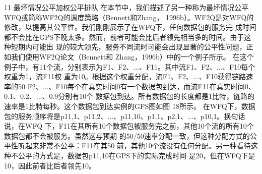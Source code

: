 11 最坏情况公平加权公平排队
在本节中，我们描述了另一种称为最坏情况公平WFQ或简称WF2Q的调度策略（Bennett和Zhang，
1996b）。WF2Q是对WFQ的修改，以提高其公平性。我们刚刚展示了在WFQ下，任何数据包的服务完
成时间都不会比在GPS下晚太多。然而，前者可能会比后者领先相当多的时间。由于这种短期内可能出
现的较大领先，服务不同流时可能会出现显著的公平性问题，正如我们使用WF2Q论文（Bennett和
Zhang，1996b）中的一个例子所示。
在这个例子中，有11个流，分别表示为F1、F2、...、F11。其中流F1、F2、...、F10每个权重为1，流F11权
重为10。根据这个权重分配，流F1、F2、...、F10获得链路速率的50%
F2、...、F10每个在真实时间0有一个数据包到达，而流F11在真实时间0、0.1、0.2、...、0.9分别有10个
数据包到达。所有数据包的长度都是1比特，链路的速率是1比特每秒。这个数据包到达实例的GPS图如图
18所示。
在WFQ下，数据包的服务顺序将是p11,1、p11,2、...、p11,10、p1,1、p2,1、...、p10,1。换句话说，在WFQ
下，F11在其所有10个数据包被服务完之前，其他10个流的所有10个数据包都不会被服务。虽然这与预期
的50/50速率分配一致，但这种分配方式的公平性听起来非常不公平：F11在其50%
前，其他10个流没有任何分配。另一种看待这种不公平的方式是，数据包p11,10在GPS下的实际完成时间
是20，但在WFQ下是10，因此前者比后者领先10。




